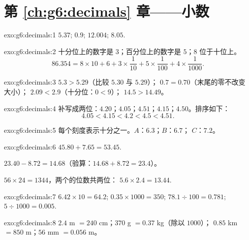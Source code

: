 \section*{第 \ref{ch:g6:decimals} 章——小数}

\begin{solution}{exo:g6:decimals:1}
$5.37$; \quad $0.9$; \quad $12.004$; \quad $8.05$.
\end{solution}

\begin{solution}{exo:g6:decimals:2}
十分位上的数字是 $3$；百分位上的数字是 $5$；$8$ 位于十位上。
\[
86.354 = 8 \times 10 + 6 + 3 \times \frac{1}{10} + 5 \times
\frac{1}{100} + 4 \times \frac{1}{1000}.
\]
\end{solution}

\begin{solution}{exo:g6:decimals:3}
$5.3 > 5.29$（比较 $5.30$ 与 $5.29$）；\quad
$0.7 = 0.70$（末尾的零不改变大小）；\quad
$2.09 < 2.9$（十分位：$0 < 9$）；\quad
$14.5 > 14.49$。
\end{solution}

\begin{solution}{exo:g6:decimals:4}
补写成两位：$4.20$；$4.05$；$4.51$；$4.15$；$4.50$。排序如下：
\[
4.05 < 4.15 < 4.2 < 4.5 < 4.51 .
\]
\end{solution}

\begin{solution}{exo:g6:decimals:5}
每个刻度表示十分之一。$A$：$6.3$；\quad $B$：$6.7$；\quad
$C$：$7.2$。
\end{solution}

\begin{solution}{exo:g6:decimals:6}
$45.80 + 7.65 = 53.45$.

$23.40 - 8.72 = 14.68$（验算：$14.68 + 8.72 = 23.4$）。

$56 \times 24 = 1344$，两个的位数共两位：
$5.6 \times 2.4 = 13.44$.
\end{solution}

\begin{solution}{exo:g6:decimals:7}
$6.42 \times 10 = 64.2$; \quad
$0.35 \times 1000 = 350$; \quad
$78.1 \div 100 = 0.781$; \quad
$5 \div 1000 = 0.005$.
\end{solution}

\begin{solution}{exo:g6:decimals:8}
$2.4$ m $= 240$ cm；\quad $370$ g $= 0.37$ kg（除以 $1000$）；
\quad $0.85$ km $= 850$ m；\quad $56$ mm $= 0.056$ m。
\end{solution}

